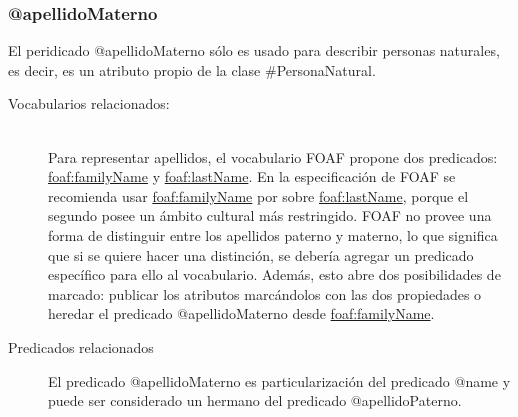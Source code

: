 \subsubsection{@apellidoMaterno}

El peridicado @apellidoMaterno sólo es usado para describir personas
naturales, es decir, es un atributo propio de la clase
\#PersonaNatural.

\begin{description}
  
\item[Vocabularios relacionados:] \hfill \\
  Para representar apellidos, el vocabulario FOAF propone dos
  predicados:
  \url{foaf:familyName} y \url{foaf:lastName}. En la especificación de
  FOAF se recomienda usar \url{foaf:familyName} por sobre
  \url{foaf:lastName}, porque el segundo posee un ámbito cultural más
  restringido. FOAF no provee una forma de distinguir entre los
  apellidos paterno y materno, lo que significa que si se quiere hacer
  una distinción, se debería agregar un predicado específico para ello
  al vocabulario. Además, esto abre dos posibilidades de marcado:
  publicar los atributos marcándolos con las dos propiedades o heredar
  el predicado @apellidoMaterno desde \url{foaf:familyName}.
\item[Predicados relacionados]
  El predicado @apellidoMaterno es particularización del
  predicado @name y puede ser considerado un hermano del predicado
  @apellidoPaterno.
\end{description}

